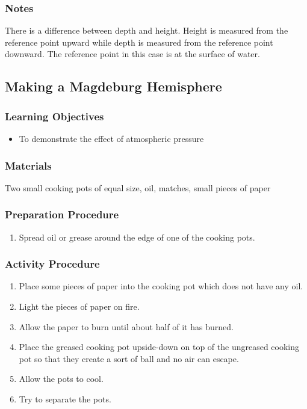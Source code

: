 \subsubsection*{Notes}
There is a difference between depth and height. Height is measured from the reference point upward while depth is measured from the reference point downward. The reference point in this case is at the surface of water. 

\subsection{Making a Magdeburg Hemisphere}

\subsubsection*{Learning Objectives}
\begin{itemize}
\item{To demonstrate the effect of atmospheric pressure} 
\end{itemize}

\subsubsection*{Materials}
Two small cooking pots of equal size, oil, matches, small pieces of paper

\subsubsection*{Preparation Procedure}
\begin{enumerate}
\item{Spread oil or grease around the edge of one of the cooking pots.} 
\end{enumerate}

\subsubsection*{Activity Procedure}
\begin{enumerate}
\item{Place some pieces of paper into the cooking pot which does not have any oil.} 
\item{Light the pieces of paper on fire.} 
\item{Allow the paper to burn until about half of it has burned.} 
\item{Place the greased cooking pot upside-down on top of the ungreased cooking pot so that they create a sort of ball and no air can escape.} 
\item{Allow the pots to cool.} 
\item{Try to separate the pots.} 
\end{enumerate}

